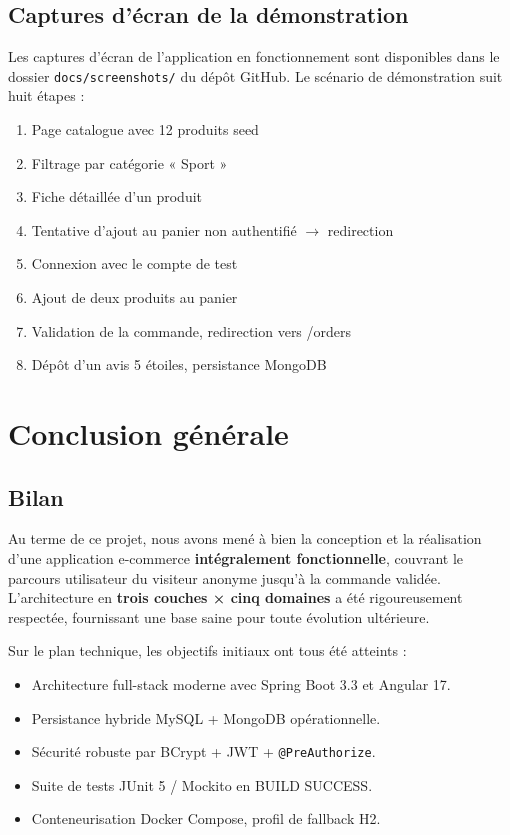 \documentclass[11pt,a4paper,oneside]{report}
\begin{document}
\section{Captures d'écran de la démonstration}

Les captures d'écran de l'application en fonctionnement sont disponibles
dans le dossier \texttt{docs/screenshots/} du dépôt GitHub. Le scénario
de démonstration suit huit étapes :

\begin{enumerate}
  \item Page catalogue avec 12 produits seed
  \item Filtrage par catégorie « Sport »
  \item Fiche détaillée d'un produit
  \item Tentative d'ajout au panier non authentifié $\to$ redirection
  \item Connexion avec le compte de test
  \item Ajout de deux produits au panier
  \item Validation de la commande, redirection vers /orders
  \item Dépôt d'un avis 5 étoiles, persistance MongoDB
\end{enumerate}

\chapter*{Conclusion générale}

\section*{Bilan}

Au terme de ce projet, nous avons mené à bien la conception et la
réalisation d'une application e-commerce \textbf{intégralement
fonctionnelle}, couvrant le parcours utilisateur du visiteur anonyme
jusqu'à la commande validée. L'architecture en \textbf{trois couches × cinq
domaines} a été rigoureusement respectée, fournissant une base saine pour
toute évolution ultérieure.

Sur le plan technique, les objectifs initiaux ont tous été atteints :
\begin{itemize}
  \item Architecture full-stack moderne avec Spring Boot 3.3 et Angular 17.
  \item Persistance hybride MySQL + MongoDB opérationnelle.
  \item Sécurité robuste par BCrypt + JWT + \texttt{@PreAuthorize}.
  \item Suite de tests JUnit 5 / Mockito en BUILD SUCCESS.
  \item Conteneurisation Docker Compose, profil de fallback H2.
\end{itemize}
\end{document}
